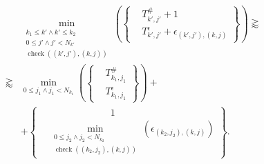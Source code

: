 \documentclass[conference]{IEEEtran}
\DeclareMathOperator{\functioncheck}{check}
\begin{document}
\begin{equation}
  \begin{aligned}
    &
    \min
    _
    {
      \begin{aligned}
        k_1 \leq k' \wedge k' \leq k_2\\
        0 \leq j' \wedge j' < N_{k'}\\
        \functioncheck
        {
          \left(
            \left( k', j' \right),
            \left( k, j \right)
          \right)
        }
      \end{aligned}
    }
    {
      \left(
        \left\{
          \begin{aligned}
            & T_{k', j'}^{\#} + 1\\
            & T_{k', j'}^{\epsilon}
            +
            \epsilon
            _
            {
              \left( k', j' \right),
              \left( k, j \right)
            }
          \end{aligned}
        \right\}
      \right)
    }
    \gtrapprox
    \\
    \gtrapprox
    &
    \min
    _
    {
      0 \leq j_1 \wedge j_1 < N_{k_1}
    }
    {
      \left(
        \left\{
          \begin{aligned}
            & T_{k_1, j_1}^{\#}\\
            & T_{k_1, j_1}^{\epsilon}
          \end{aligned}
        \right\}
      \right)
    }
    +
    \\
    &
    +
    \left\{
      \begin{aligned}
        &
        \: \: \: \: \: \: \: \: \: \: \: \: \: \: \: \: \: \: \: \: \: \: \: \: \: \: \: \: \:
        1\\
        &
        \min
        _
        {
          \begin{aligned}
            0 \leq j_2 \wedge j_2 < N_{k_2}\\
            \functioncheck
            {
              \left(
                \left( k_2, j_2 \right),
                \left( k, j \right)
              \right)
            }
          \end{aligned}
        }
        {
          \left(
            \epsilon
            _
            {
              \left( k_2, j_2 \right),
              \left( k, j \right)
            }
          \right)
        }
      \end{aligned}
    \right\}
    .
  \end{aligned}
  \label{eq:OptimizationFormula2}
\end{equation}
\end{document}
